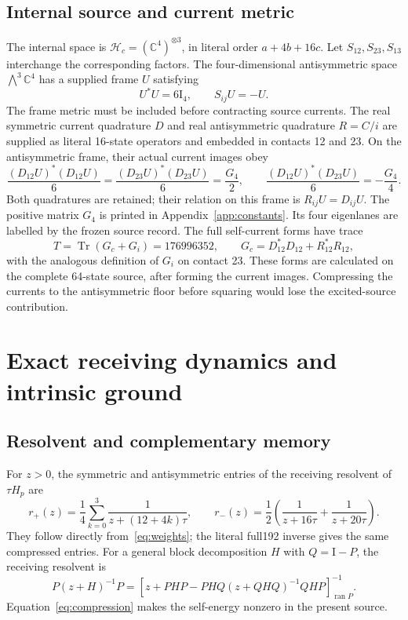 \documentclass[11pt]{article}
\theoremstyle{definition}
\newcommand{\HH}{\mathcal H}
\newcommand{\Id}{\mathrm I}
\newcommand{\Tr}{\operatorname{Tr}}
\newcommand{\ran}{\operatorname{ran}}
\begin{document}
\subsection{Internal source and current metric}

The internal space is $\HH_c=(\mathbb C^4)^{\otimes3}$, in literal order $a+4b+16c$. Let $S_{12},S_{23},S_{13}$ interchange the corresponding factors. The four-dimensional antisymmetric space $\bigwedge^3\mathbb C^4$ has a supplied frame $U$ satisfying
\begin{equation}\label{eq:colour}
 U^*U=6\Id_4,\qquad S_{ij}U=-U.
\end{equation}
The frame metric must be included before contracting source currents. The real symmetric current quadrature $D$ and real antisymmetric quadrature $R=C/i$ are supplied as literal 16-state operators and embedded in contacts 12 and 23. On the antisymmetric frame, their actual current images obey
\begin{equation}\label{eq:current}
 \frac{(D_{12}U)^*(D_{12}U)}6=
 \frac{(D_{23}U)^*(D_{23}U)}6=\frac{G_4}{2},\qquad
 \frac{(D_{12}U)^*(D_{23}U)}6=-\frac{G_4}{4}.
\end{equation}
Both quadratures are retained; their relation on this frame is $R_{ij}U=D_{ij}U$. The positive matrix $G_4$ is printed in Appendix~\ref{app:constants}. Its four eigenlanes are labelled by the frozen source record. The full self-current forms have trace
\begin{equation}\label{eq:trace}
 T=\Tr(G_c+G_i)=176996352,\qquad
 G_c=D_{12}^*D_{12}+R_{12}^*R_{12},
\end{equation}
with the analogous definition of $G_i$ on contact 23. These forms are calculated on the complete 64-state source, after forming the current images. Compressing the currents to the antisymmetric floor before squaring would lose the excited-source contribution.

\section{Exact receiving dynamics and intrinsic ground}\label{sec:ground}

\subsection{Resolvent and complementary memory}

For $z>0$, the symmetric and antisymmetric entries of the receiving resolvent of $\tau H_p$ are
\begin{equation}\label{eq:resolvent}
 r_+(z)=\frac14\sum_{k=0}^3\frac1{z+(12+4k)\tau},\qquad
 r_-(z)=\frac12\left(\frac1{z+16\tau}+\frac1{z+20\tau}\right).
\end{equation}
They follow directly from~\eqref{eq:weights}; the literal full192 inverse gives the same compressed entries. For a general block decomposition $H$ with $Q=\Id-P$, the receiving resolvent is
\begin{equation}\label{eq:schur}
 P(z+H)^{-1}P=
 \left[z+PHP-PHQ(z+QHQ)^{-1}QHP\right]^{-1}_{\ran P}.
\end{equation}
Equation~\eqref{eq:compression} makes the self-energy nonzero in the present source.
\end{document}
